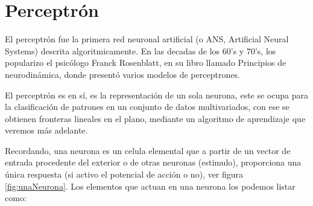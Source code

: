 \section{Perceptrón}

El perceptrón fue la primera red neuronal artificial (o ANS, Artificial Neural Systems) descrita algoritmicamente. En las decadas de los 60's y 70's, los popularizo el psicólogo Franck Rosenblatt, en su libro llamado Principios de neurodinámica, donde presentó varios modelos de perceptrones.

El perceptrón es en sí, es la representación de un sola neurona, este se ocupa para la clasificación de patrones en un conjunto de datos multivariados, con ese se obtienen fronteras lineales en el plano, mediante un algoritmo de aprendizaje que veremos más adelante.

Recordando, una neurona es un celula elemental que a partir de un vector de entrada procedente del exterior o de otras neuronas (estimulo), proporciona una única respuesta (si activo el potencial de acción o no), ver figura \ref{fig:unaNeurona}. Los elementos que actuan en una neurona los podemos listar como:
